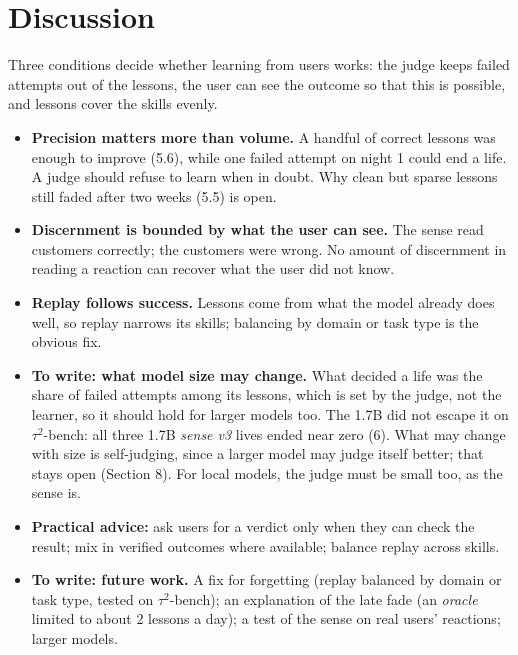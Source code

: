 \section{Discussion}

Three conditions decide whether learning from users works: the judge keeps failed attempts out of the lessons, the user can see the outcome so that this is possible, and lessons cover the skills evenly.

\begin{itemize}
\tightlist
\item
  \textbf{Precision matters more than volume.} A handful of correct lessons was enough to improve (5.6), while one failed attempt on night 1 could end a life. A judge should refuse to learn when in doubt. Why clean but sparse lessons still faded after two weeks (5.5) is open.
\item
  \textbf{Discernment is bounded by what the user can see.} The sense read customers correctly; the customers were wrong. No amount of discernment in reading a reaction can recover what the user did not know.
\item
  \textbf{Replay follows success.} Lessons come from what the model already does well, so replay narrows its skills; balancing by domain or task type is the obvious fix.
\item
  \textbf{To write: what model size may change.} What decided a life was the share of failed attempts among its lessons, which is set by the judge, not the learner, so it should hold for larger models too. The 1.7B did not escape it on $\tau^2$-bench: all three 1.7B \emph{sense v3} lives ended near zero (6). What may change with size is self-judging, since a larger model may judge itself better; that stays open (Section 8). For local models, the judge must be small too, as the sense is.
\item
  \textbf{Practical advice:} ask users for a verdict only when they can check the result; mix in verified outcomes where available; balance replay across skills.
\item
  \textbf{To write: future work.} A fix for forgetting (replay balanced by domain or task type, tested on $\tau^2$-bench); an explanation of the late fade (an \emph{oracle} limited to about 2 lessons a day); a test of the sense on real users' reactions; larger models.
\end{itemize}
